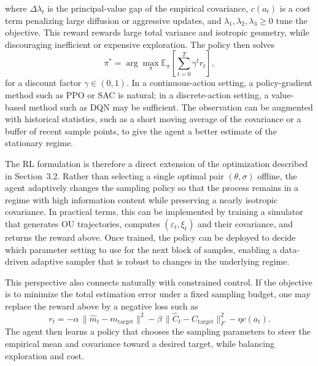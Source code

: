 \documentclass[11pt]{article}
\begin{document}
where $\Delta\lambda_t$ is the principal-value gap of the empirical covariance, $c(a_t)$ is a cost term penalizing large diffusion or aggressive updates, and $\lambda_1,\lambda_2,\lambda_3\ge 0$ tune the objective. This reward rewards large total variance and isotropic geometry, while discouraging inefficient or expensive exploration. The policy then solves
\begin{equation}
    \pi^* = \arg\max_{\pi}
    \mathbb{E}_{\pi}\left[
        \sum_{t=0}^{T} \gamma^t r_t
        \right],
\end{equation}
for a discount factor $\gamma\in(0,1)$. In a continuous-action setting, a policy-gradient method such as PPO or SAC is natural; in a discrete-action setting, a value-based method such as DQN may be sufficient. The observation can be augmented with historical statistics, such as a short moving average of the covariance or a buffer of recent sample points, to give the agent a better estimate of the stationary regime.

The RL formulation is therefore a direct extension of the optimization described in Section~3.2. Rather than selecting a single optimal pair $(\theta,\sigma)$ offline, the agent adaptively changes the sampling policy so that the process remains in a regime with high information content while preserving a nearly isotropic covariance. In practical terms, this can be implemented by training a simulator that generates OU trajectories, computes $(\varepsilon_t,\xi_t)$ and their covariance, and returns the reward above. Once trained, the policy can be deployed to decide which parameter setting to use for the next block of samples, enabling a data-driven adaptive sampler that is robust to changes in the underlying regime.

This perspective also connects naturally with constrained control. If the objective is to minimize the total estimation error under a fixed sampling budget, one may replace the reward above by a negative loss such as
\begin{equation}
    r_t = -\alpha\,\|\hat{m}_t-m_\mathrm{target}\|^2
    -\beta\,\|\hat{C}_t-C_\mathrm{target}\|_F^2
    -\eta c(a_t).
\end{equation}
The agent then learns a policy that chooses the sampling parameters to steer the empirical mean and covariance toward a desired target, while balancing exploration and cost.
\end{document}
